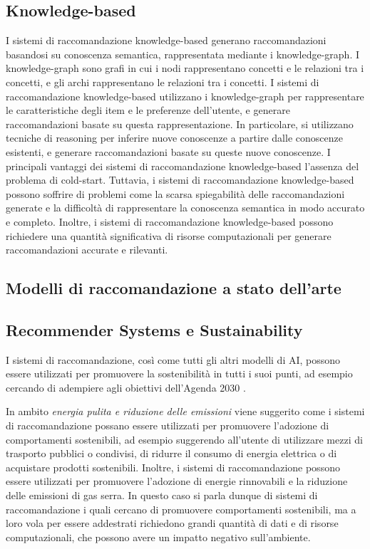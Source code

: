 \subsection{Knowledge-based}
I sistemi di raccomandazione knowledge-based generano raccomandazioni basandosi su conoscenza semantica, rappresentata mediante i knowledge-graph. I knowledge-graph sono grafi in cui i nodi rappresentano concetti e le relazioni tra i concetti, e gli archi rappresentano le relazioni tra i concetti. I sistemi di raccomandazione knowledge-based utilizzano i knowledge-graph per rappresentare le caratteristiche degli item e le preferenze dell'utente, e generare raccomandazioni basate su questa rappresentazione. In particolare, si utilizzano tecniche di reasoning per inferire nuove conoscenze a partire dalle conoscenze esistenti, e generare raccomandazioni basate su queste nuove conoscenze. I principali vantaggi dei sistemi di raccomandazione knowledge-based l'assenza del problema di cold-start. Tuttavia, i sistemi di raccomandazione knowledge-based possono soffrire di problemi come la scarsa spiegabilità delle raccomandazioni generate e la difficoltà di rappresentare la conoscenza semantica in modo accurato e completo. Inoltre, i sistemi di raccomandazione knowledge-based possono richiedere una quantità significativa di risorse computazionali per generare raccomandazioni accurate e rilevanti.\\

\subsection{Modelli di raccomandazione a stato dell'arte}


\subsection{Recommender Systems e Sustainability}

I sistemi di raccomandazione, così come tutti gli altri modelli di AI, possono essere utilizzati per promuovere la sostenibilità in tutti i suoi punti, ad esempio cercando di adempiere agli obiettivi dell'Agenda 2030 \cite{RecommenderSustainability}.

\noindent In ambito \textit{energia pulita e riduzione delle emissioni} viene suggerito come i sistemi di raccomandazione possano essere utilizzati per promuovere l'adozione di comportamenti sostenibili, ad esempio suggerendo all'utente di utilizzare mezzi di trasporto pubblici o condivisi, di ridurre il consumo di energia elettrica o di acquistare prodotti sostenibili. Inoltre, i sistemi di raccomandazione possono essere utilizzati per promuovere l'adozione di energie rinnovabili e la riduzione delle emissioni di gas serra. In questo caso si parla dunque di sistemi di raccomandazione i quali cercano di promuovere comportamenti sostenibili, ma a loro vola per essere addestrati richiedono grandi quantità di dati e di risorse computazionali, che possono avere un impatto negativo sull'ambiente.

